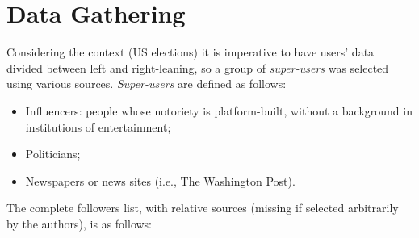 \section{Data Gathering}

Considering the context (US elections) it is imperative to have users' data divided between left and right-leaning, so a group of \textit{super-users} was selected using various sources. 
\textit{Super-users} are defined as follows:

\begin{itemize}
    \item Influencers: people whose notoriety is platform-built, without a background in institutions of entertainment;
    \item Politicians;
    \item Newspapers or news sites (i.e., The Washington Post).
\end{itemize}

The complete followers list, with relative sources (missing if selected arbitrarily by the authors), is as follows:

